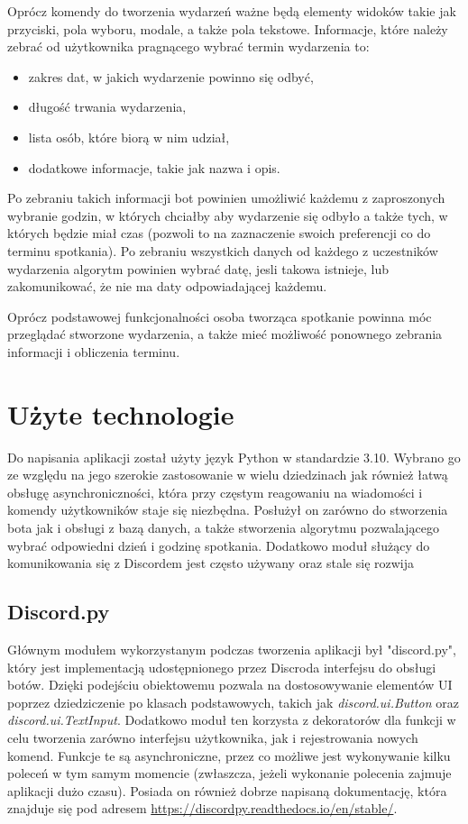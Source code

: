 \documentclass[12pt,a4paper]{article}
\begin{document}
Oprócz komendy do tworzenia wydarzeń ważne będą elementy widoków takie jak przyciski, pola wyboru, modale, a także pola tekstowe. Informacje, które należy zebrać od użytkownika pragnącego wybrać termin wydarzenia to:
\begin{itemize}
    \item zakres dat, w jakich wydarzenie powinno się odbyć,
    \item długość trwania wydarzenia,
    \item lista osób, które biorą w nim udział,
    \item dodatkowe informacje, takie jak nazwa i opis.
\end{itemize}

Po zebraniu takich informacji bot powinien umożliwić każdemu z zaproszonych wybranie godzin, w których chciałby aby wydarzenie się odbyło a także tych, w których będzie miał czas (pozwoli to na zaznaczenie swoich preferencji co do terminu spotkania). Po zebraniu wszystkich danych od każdego z uczestników wydarzenia algorytm powinien wybrać datę, jesli takowa istnieje, lub zakomunikować, że nie ma daty odpowiadającej każdemu.

Oprócz podstawowej funkcjonalności osoba tworząca spotkanie powinna móc przeglądać stworzone wydarzenia, a także mieć możliwość ponownego zebrania informacji i obliczenia terminu.

\section{Użyte technologie}

Do napisania aplikacji został użyty język Python w standardzie 3.10. Wybrano go ze względu na jego szerokie zastosowanie w wielu dziedzinach jak również łatwą obsługę asynchroniczności, która przy częstym reagowaniu na wiadomości i komendy użytkowników staje się niezbędna. Posłużył on zarówno do stworzenia bota jak i obsługi z bazą danych, a także stworzenia algorytmu pozwalającego wybrać odpowiedni dzień i godzinę spotkania. Dodatkowo moduł służący do komunikowania się z Discordem jest często używany oraz stale się rozwija

\subsection{Discord.py}

Głównym modułem wykorzystanym podczas tworzenia aplikacji był "discord.py", który jest implementacją udostępnionego przez Discroda interfejsu do obsługi botów. Dzięki podejściu obiektowemu pozwala na dostosowywanie elementów UI poprzez dziedziczenie po klasach podstawowych, takich jak \textit{discord.ui.Button} oraz \textit{discord.ui.TextInput}. Dodatkowo moduł ten korzysta z dekoratorów dla funkcji w celu tworzenia zarówno interfejsu użytkownika, jak i rejestrowania nowych komend. Funkcje te są asynchroniczne, przez co możliwe jest wykonywanie kilku poleceń w tym samym momencie (zwłaszcza, jeżeli wykonanie polecenia zajmuje aplikacji dużo czasu). Posiada on również dobrze napisaną dokumentację, która znajduje się pod adresem \href{https://discordpy.readthedocs.io/en/stable/}{https://discordpy.readthedocs.io/en/stable/}.
\end{document}
